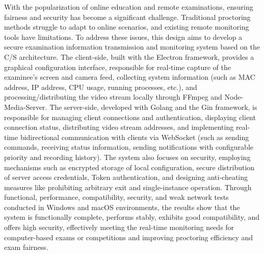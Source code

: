 {}

\begin{abstracten}
With the popularization of online education and remote examinations, ensuring fairness and security has become a 
significant challenge. Traditional proctoring methods struggle to adapt to online scenarios, and existing remote
 monitoring tools have limitations. To address these issues, this design aims to develop a secure examination 
 information transmission and monitoring system based on the C/S architecture. The client-side, built with the 
 Electron framework, provides a graphical configuration interface, responsible for real-time capture of the 
 examinee's screen and camera feed, collecting system information (such as MAC address, IP address, CPU usage, 
 running processes, etc.), and processing/distributing the video stream locally through FFmpeg and Node-Media-Server. 
 The server-side, developed with Golang and the Gin framework, is responsible for managing client connections and 
 authentication, displaying client connection status, distributing video stream addresses, and implementing real-time bidirectional 
 communication with clients via WebSocket (such as sending commands, receiving status information, sending notifications 
 with configurable priority and recording history). The system also focuses on security, employing mechanisms such 
 as encrypted storage of local configuration, secure distribution of server access credentials, Token authentication, 
 and designing anti-cheating measures like prohibiting arbitrary exit and single-instance operation. 
 Through functional, performance, compatibility, security, and weak network tests conducted in Windows 
 and macOS environments, the results show that the system is functionally complete, performs stably, exhibits 
 good compatibility, and offers high security, effectively meeting the real-time monitoring needs for computer-based 
 exams or competitions and improving proctoring efficiency and exam fairness.
\end{abstracten}